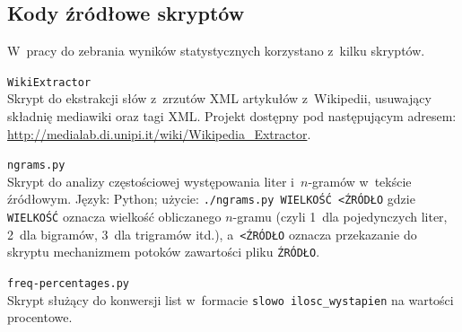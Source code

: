 \documentclass[12pt,a4paper,twoside]{article}
\newcounter{sccounter} %
\begin{document}
\begin{appendices}
\section{Kody źródłowe skryptów}
W~pracy do zebrania wyników statystycznych korzystano z~kilku skryptów.

\begin{myenumerate}

    \item {}\label{sc:wiki_extractor}
    \texttt{WikiExtractor} \\
    Skrypt do ekstrakcji słów z~zrzutów XML artykułów z~Wikipedii, usuwający
    składnię mediawiki oraz tagi XML. Projekt dostępny pod następującym
    \mbox{adresem}: \url{http://medialab.di.unipi.it/wiki/Wikipedia_Extractor}.

    \item {}\label{sc:ngrams_counter}
    \texttt{ngrams.py} \\
    Skrypt do analizy częstościowej występowania liter i~$n$-gramów w~tekście
    źródłowym. Język: Python; użycie: \texttt{./ngrams.py WIELKOŚĆ <ŹRÓDŁO}
    gdzie \texttt{WIELKOŚĆ} oznacza wielkość obliczanego $n$-gramu (czyli 1~dla
    pojedynczych liter, 2~dla bigramów, 3~dla trigramów itd.),
    a~\texttt{<ŹRÓDŁO} oznacza przekazanie do skryptu mechanizmem potoków
    zawartości pliku \texttt{ŹRÓDŁO}.
    

    \pagebreak
    \item {}\label{sc:freq_percentages}
    \texttt{freq-percentages.py} \\
    Skrypt służący do konwersji list w~formacie \texttt{slowo ilosc\_wystapien}
    na wartości procentowe.
    

\end{myenumerate}

\end{appendices}
\end{document}
